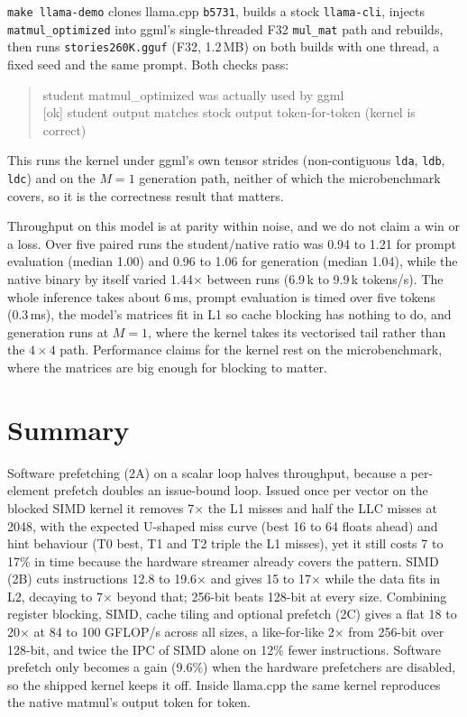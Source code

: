 \documentclass[11pt,a4paper]{article}
\begin{document}
\texttt{make llama-demo} clones llama.cpp \texttt{b5731}, builds a stock \texttt{llama-cli}, injects \texttt{matmul\_optimized} into ggml's single-threaded F32 \texttt{mul\_mat} path and rebuilds, then runs \texttt{stories260K.gguf} (F32, 1.2\,MB) on both builds with one thread, a fixed seed and the same prompt. Both checks pass:
\begin{quote}\small\ttfamily
[ok] student matmul\_optimized was actually used by ggml\\
{[ok]} student output matches stock output token-for-token (kernel is correct)
\end{quote}
This runs the kernel under ggml's own tensor strides (non-contiguous \texttt{lda}, \texttt{ldb}, \texttt{ldc}) and on the $M=1$ generation path, neither of which the microbenchmark covers, so it is the correctness result that matters.

Throughput on this model is at parity within noise, and we do not claim a win or a loss. Over five paired runs the student/native ratio was 0.94 to 1.21 for prompt evaluation (median 1.00) and 0.96 to 1.06 for generation (median 1.04), while the native binary by itself varied 1.44$\times$ between runs (6.9\,k to 9.9\,k tokens/s). The whole inference takes about 6\,ms, prompt evaluation is timed over five tokens (0.3\,ms), the model's matrices fit in L1 so cache blocking has nothing to do, and generation runs at $M=1$, where the kernel takes its vectorised tail rather than the $4\times4$ path. Performance claims for the kernel rest on the microbenchmark, where the matrices are big enough for blocking to matter.

\section{Summary}

Software prefetching (2A) on a scalar loop halves throughput, because a per-element prefetch doubles an issue-bound loop. Issued once per vector on the blocked SIMD kernel it removes 7$\times$ the L1 misses and half the LLC misses at 2048, with the expected U-shaped miss curve (best 16 to 64 floats ahead) and hint behaviour (T0 best, T1 and T2 triple the L1 misses), yet it still costs 7 to 17\% in time because the hardware streamer already covers the pattern. SIMD (2B) cuts instructions 12.8 to 19.6$\times$ and gives 15 to 17$\times$ while the data fits in L2, decaying to 7$\times$ beyond that; 256-bit beats 128-bit at every size. Combining register blocking, SIMD, cache tiling and optional prefetch (2C) gives a flat 18 to 20$\times$ at 84 to 100 GFLOP/s across all sizes, a like-for-like 2$\times$ from 256-bit over 128-bit, and twice the IPC of SIMD alone on 12\% fewer instructions. Software prefetch only becomes a gain (9.6\%) when the hardware prefetchers are disabled, so the shipped kernel keeps it off. Inside llama.cpp the same kernel reproduces the native matmul's output token for token.
\end{document}
